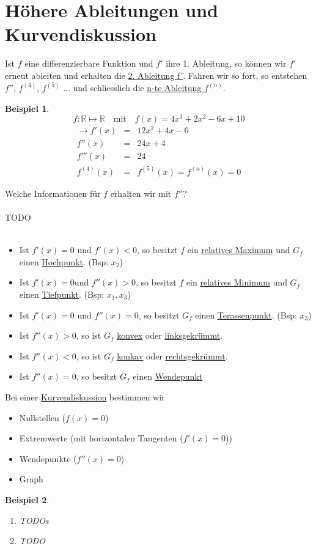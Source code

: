 \documentclass{report}
\newtheorem{myexample}{Beispiel}
\begin{document}
\section{Höhere Ableitungen und Kurvendiskussion}
Ist $f$ eine differenzierbare Funktion und $f'$ ihre 1. Ableitung, so können wir $f'$ erneut ableiten und erhalten die \underline{2. Ableitung f''}. Fahren wir so fort, so entstehen $f''$, $f^{(4)}$, $f^{(5)}$ ... und schliesslich die \underline{n-te Ableitung $f^{(n)}$}.
\begin{myexample}\begin{equation}f: \mathbb{R} \mapsto \mathbb{R} \quad \mbox{mit} \quad f(x) = 4x^3+2x^2 -6x+10\end{equation}
\begin{eqnarray}\to f'(x) & = & 12x^2 + 4x -6 \nonumber \\
f''(x) & = & 24x + 4 \nonumber \\
f'''(x) & = & 24 \nonumber \\
f^{(4)}(x) & = & f^{(5)}(x) = f^{(n)}(x) = 0 
\end{eqnarray}\end{myexample}
Welche Informationen für $f$ erhalten wir mit $f''$?
\\\\TODO\\\\
\begin{itemize}
\item Ist $f'(x) = 0$ und $f'(x) < 0$, so besitzt $f$ ein \underline{relatives Maximum} und $G_f$ einen \underline{Hochpunkt}. (Bsp: $x_2$)
\item Ist $f'(x) = 0$und $f''(x) > 0$, so besitzt $f$ ein \underline{relatives Minimum} und $G_f$ einen \underline{Tiefpunkt}. (Bsp: $x_1, x_3$)
\item Ist $f'(x) = 0$ und $f''(x) = 0$, so besitzt $G_f$ einen \underline{Terassenpunkt}. (Bsp: $x_3$)
\item Ist $f''(x) > 0$, so ist $G_f$ \underline{konvex} oder \underline{linksgekrümmt}.
\item Ist $f''(x) < 0$, so ist $G_f$ \underline{konkav} oder \underline{rechtsgekrümmt}.
\item Ist $f''(x) = 0$, so besitzt $G_f$ einen \underline{Wendepunkt}
\end{itemize}
Bei einer \underline{Kurvendiskussion} bestimmen wir
\begin{itemize}
\item Nullstellen ($f(x) = 0$)
\item Extremwerte (mit horizontalen Tangenten ($f'(x)=0$))
\item Wendepunkte ($f''(x)=0$)
\item Graph
\end{itemize}
\begin{myexample}
\begin{enumerate}
\item TODOs
\item TODO\end{enumerate}
\end{myexample}
\end{document}
